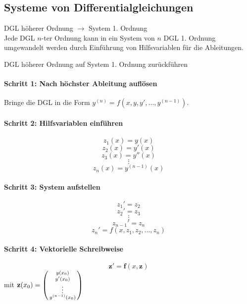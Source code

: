 \subsection{Systeme von Differentialgleichungen}

\begin{concept}{DGL höherer Ordnung $\rightarrow$ System 1. Ordnung}\\
Jede DGL $n$-ter Ordnung kann in ein System von $n$ DGL 1. Ordnung umgewandelt werden durch Einführung von Hilfsvariablen für die Ableitungen.
\end{concept}

\begin{KR}{DGL höherer Ordnung auf System 1. Ordnung zurückführen}
\paragraph{Schritt 1: Nach höchster Ableitung auflösen}
Bringe die DGL in die Form $y^{(n)} = f(x, y, y', ..., y^{(n-1)})$.

\paragraph{Schritt 2: Hilfsvariablen einführen}
$$z_1(x) = y(x)$$
$$z_2(x) = y'(x)$$
$$z_3(x) = y''(x)$$
$$\vdots$$
$$z_n(x) = y^{(n-1)}(x)$$

\paragraph{Schritt 3: System aufstellen}
$$z_1' = z_2$$
$$z_2' = z_3$$
$$\vdots$$
$$z_{n-1}' = z_n$$
$$z_n' = f(x, z_1, z_2, ..., z_n)$$

\paragraph{Schritt 4: Vektorielle Schreibweise}
$$\mathbf{z}' = \mathbf{f}(x, \mathbf{z})$$ mit $\mathbf{z}(x_0) = \begin{psmallmatrix} y(x_0) \\ y'(x_0) \\ \vdots \\ y^{(n-1)}(x_0) \end{psmallmatrix}$
\end{KR}


